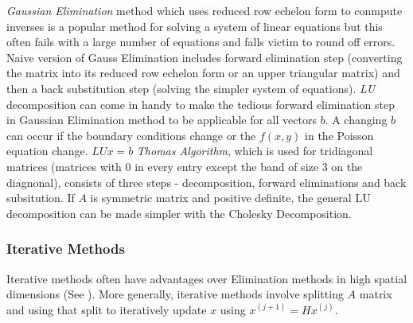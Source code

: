 \documentclass[12pt]{article}
\begin{document}
\textit{Gaussian Elimination} method which uses reduced row echelon form to conmpute inverses is a popular method for solving a system of linear equations but this often fails with a large number of equations and falls victim to round off errors. Naive version of Gauss Elimination includes forward elimination step (converting the matrix into its reduced row echelon form or an upper triangular matrix) and then a back substitution step (solving the simpler system of equations). \textit{LU} decomposition can come in handy to make the tedious forward elimination step in Gaussian Elimination method to be applicable for all vectors $b$. A changing $b$ can occur if the boundary conditions change or the $f(x, y)$ in the Poisson equation change. $LUx = b$ \textit{Thomas Algorithm}, which is used for tridiagonal matrices (matrices with $0$ in every entry except the band of size $3$ on the diagnonal), consists of three steps - decomposition, forward eliminations and back subsitution. If $A$ is symmetric matrix and positive definite, the general LU decomposition can be made simpler with the Cholesky Decomposition.


\subsubsection{Iterative Methods}

Iterative methods often have advantages over Elimination methods in high spatial dimensions (See ). More generally, iterative methods involve splitting $A$ matrix and using that split to iteratively update $x$ using $x^{(j + 1)} = H x^{(j)}$. 
\end{document}
